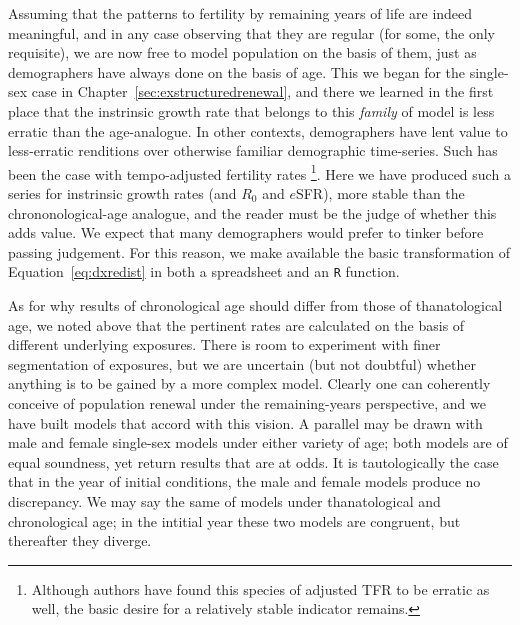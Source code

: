 Assuming that the patterns to fertility by remaining years of life
are indeed meaningful, and in any case observing that they are regular (for
some, the only requisite), we are now free to model population on the basis of
them, just as demographers have always done on the basis of age. This we began
for the single-sex case in Chapter~\ref{sec:exstructuredrenewal}, and there we
learned in the first place that the instrinsic growth rate that belongs to this
\textit{family} of model is less erratic than the age-analogue. In other
contexts, demographers have lent value to less-erratic renditions over otherwise
familiar demographic time-series. Such has been the case with tempo-adjusted
fertility rates \citep{bongaarts1998quantum}\footnote{Although authors
\citep[e.g.][]{kim2000quantum} have found this species of adjusted TFR to be
erratic as well, the basic desire for a relatively stable indicator remains.}.
Here we have produced such a series for instrinsic growth rates (and $R_0$ and $e$SFR), 
more stable than the chrononological-age analogue, and the reader must be the 
judge of whether this adds value. We expect that many demographers would prefer
to tinker before passing judgement. For this reason, we make available the 
basic transformation of Equation~\eqref{eq:dxredist} in both a spreadsheet and
an \texttt{R} function.

As for why results of chronological age should differ from those of
thanatological age, we noted above that the pertinent rates are calculated on
the basis of different underlying exposures. There is room to experiment with
 finer segmentation of exposures, but we are uncertain (but not doubtful)
 whether anything is to be gained by a more complex model. Clearly one can
coherently conceive of population renewal under the remaining-years
perspective, and we have built models that accord with this vision. A parallel
may be drawn with male and female single-sex models under either variety of
age; both models are of equal soundness, yet return results that are at odds. 
It is tautologically the case that in the year of initial conditions, the male and
female models produce no discrepancy. We may say the same of models under
thanatological and chronological age; in the intitial year these two models are
congruent, but thereafter they diverge.

